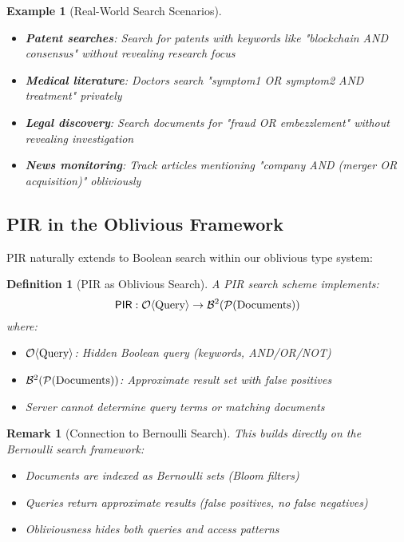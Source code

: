 \documentclass[11pt,final,hidelinks]{article}
\newtheorem{definition}[theorem]{Definition}
\newtheorem{example}[theorem]{Example}
\newtheorem{remark}[theorem]{Remark}
\begin{document}
\begin{example}[Real-World Search Scenarios]
\begin{itemize}
    \item \textbf{Patent searches}: Search for patents with keywords like "blockchain AND consensus" without revealing research focus
    \item \textbf{Medical literature}: Doctors search "symptom1 OR symptom2 AND treatment" privately
    \item \textbf{Legal discovery}: Search documents for "fraud OR embezzlement" without revealing investigation
    \item \textbf{News monitoring}: Track articles mentioning "company AND (merger OR acquisition)" obliviously
\end{itemize}
\end{example}

\subsection{PIR in the Oblivious Framework}

PIR naturally extends to Boolean search within our oblivious type system:

\begin{definition}[PIR as Oblivious Search]
A PIR search scheme implements:
\begin{equation}
\mathsf{PIR}: \Obv{\text{Query}} \to \Bernoulli{\mathcal{P}(\text{Documents})}{2}
\end{equation}
where:
\begin{itemize}
    \item $\Obv{\text{Query}}$: Hidden Boolean query (keywords, AND/OR/NOT)
    \item $\Bernoulli{\mathcal{P}(\text{Documents})}{2}$: Approximate result set with false positives
    \item Server cannot determine query terms or matching documents
\end{itemize}
\end{definition}

\begin{remark}[Connection to Bernoulli Search]
This builds directly on the Bernoulli search framework:
\begin{itemize}
    \item Documents are indexed as Bernoulli sets (Bloom filters)
    \item Queries return approximate results (false positives, no false negatives)
    \item Obliviousness hides both queries and access patterns
\end{itemize}
\end{remark}
\end{document}
